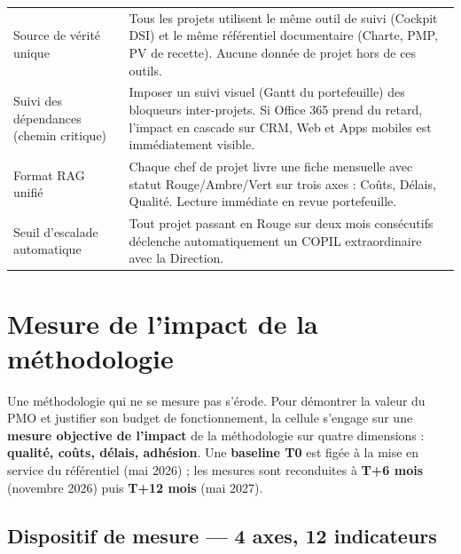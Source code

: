 \documentclass[11pt,a4paper,oneside]{report}
\begin{document}
\vspace{4pt}
\begin{center}
\renewcommand{\arraystretch}{1.5}
\begin{tabularx}{\textwidth}{L{4.5cm} L{9.5cm}}
\toprule
{}
 &  \\
\midrule
Source de vérité unique & Tous les projets utilisent le même outil de suivi (Cockpit DSI) et le même référentiel documentaire (Charte, PMP, PV de recette). Aucune donnée de projet hors de ces outils. \\
Suivi des dépendances (chemin critique) & Imposer un suivi visuel (Gantt du portefeuille) des bloqueurs inter-projets. Si Office 365 prend du retard, l'impact en cascade sur CRM, Web et Apps mobiles est immédiatement visible. \\
Format RAG unifié & Chaque chef de projet livre une fiche mensuelle avec statut Rouge/Ambre/Vert sur trois axes : Coûts, Délais, Qualité. Lecture immédiate en revue portefeuille. \\
Seuil d'escalade automatique & Tout projet passant en Rouge sur deux mois consécutifs déclenche automatiquement un COPIL extraordinaire avec la Direction. \\
\bottomrule
\end{tabularx}
\end{center}

\section{Mesure de l'impact de la méthodologie}

\begin{finding}
Une méthodologie qui ne se mesure pas s'érode. Pour démontrer la valeur du PMO et justifier son budget de fonctionnement, la cellule s'engage sur une \textbf{mesure objective de l'impact} de la méthodologie sur quatre dimensions : \textbf{qualité, coûts, délais, adhésion}. Une \textbf{baseline T0} est figée à la mise en service du référentiel (mai 2026) ; les mesures sont reconduites à \textbf{T+6 mois} (novembre 2026) puis \textbf{T+12 mois} (mai 2027).
\end{finding}

\subsection*{Dispositif de mesure --- 4 axes, 12 indicateurs}
\end{document}
